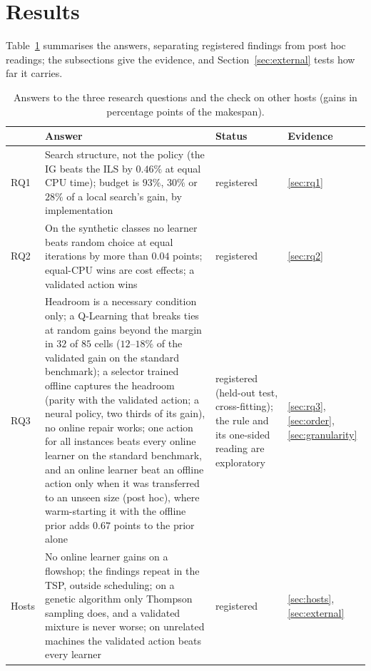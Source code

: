\section{Results}
\label{sec:results}
Table~\ref{tab:answers} summarises the answers, separating registered findings from post hoc readings; the subsections give the evidence, and Section~\ref{sec:external} tests how far it carries.

\begin{table}[t]
\caption{Answers to the three research questions and the check on other hosts (gains in percentage points of the makespan).}
\label{tab:answers}
\centering
{\scriptsize\setlength{\tabcolsep}{3pt}
\begin{tabular}{@{}lp{7.6cm}p{2.6cm}l@{}}
\toprule
 & Answer & Status & Evidence \\
\midrule
RQ1 & Search structure, not the policy (the IG beats the ILS by $0.46\%$ at equal CPU time); budget is $93\%$, $30\%$ or $28\%$ of a local search's gain, by implementation & registered & \ref{sec:rq1} \\
RQ2 & On the synthetic classes no learner beats random choice at equal iterations by more than $0.04$ points; equal-CPU wins are cost effects; a validated action wins & registered & \ref{sec:rq2} \\
RQ3 & Headroom is a necessary condition only; a Q-Learning that breaks ties at random gains beyond the margin in $32$ of $85$ cells ($12$--$18\%$ of the validated gain on the standard benchmark); a selector trained offline captures the headroom (parity with the validated action; a neural policy, two thirds of its gain), no online repair works; one action for all instances beats every online learner on the standard benchmark, and an online learner beat an offline action only when it was transferred to an unseen size (post hoc), where warm-starting it with the offline prior adds $0.67$ points to the prior alone & registered (held-out test, cross-fitting); the rule and its one-sided reading are exploratory & \ref{sec:rq3}, \ref{sec:order}, \ref{sec:granularity} \\
Hosts & No online learner gains on a flowshop; the findings repeat in the TSP, outside scheduling; on a genetic algorithm only Thompson sampling does, and a validated mixture is never worse; on unrelated machines the validated action beats every learner & registered & \ref{sec:hosts}, \ref{sec:external} \\
\bottomrule
\end{tabular}}
\end{table}

